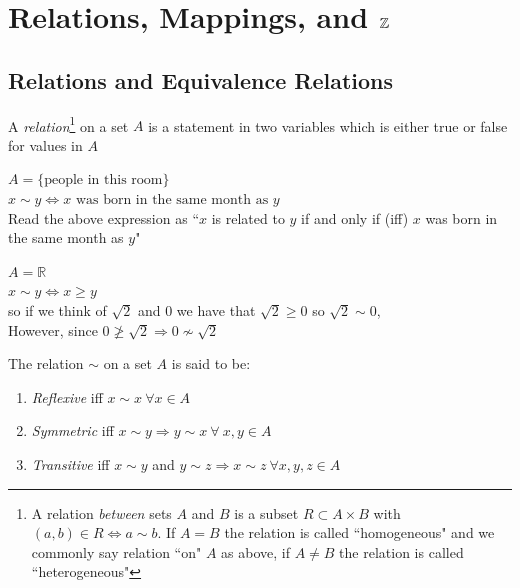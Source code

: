 


\chapter{\texorpdfstring{Relations, Mappings, and ${\mathbb{ Z}}$}{Relations, Mappings, and Z (integers)}}
\vspace{-0.1in}
\section{Relations and Equivalence Relations}
\begin{definition}[Relations]
A \textit{relation}\footnote{
    A relation \textit{between} sets $A$ and $B$ is a subset $R\subset A\times B$ with $(a,b)\in R \iff a\sim b $. If $A=B$ the relation is called ``homogeneous" and we commonly say relation ``on" $A$ as above, if $A\neq B$ the relation is called ``heterogeneous"
} on a set $A$ is a statement in two variables which is either true or false for values in $A$
\end{definition}
\begin{example}
\label{ex:firstExample}
$A=\{\text{people in this room}\}$\\
$x\sim y \Leftrightarrow x \text{ was born in the same month as } y$\\
Read the above expression as ``$x$ is related to $y$ if and only if (iff) $x$ was born in the same month as $y$"
\end{example}
\begin{example}
    \label{ex:secondExample}
$A=\mathbb{R}$\\
$x\sim y \Leftrightarrow x \geq y$\\
so if we think of $\sqrt{2}$ and $0$ we have that $\sqrt{2}\geq 0$ so $\sqrt{2}\sim 0$, \\
However, since $0 \not\geq \sqrt{2} \Rightarrow 0\not\sim \sqrt{2}$
\end{example}
\begin{definition}
The relation $\sim$ on a set $A$ is said to be:
\begin{enumerate}[label=\roman*)]
    \item \textit{Reflexive} iff $x\sim x \ \forall x \in A$
    \item \textit{Symmetric} iff $x\sim y \Rightarrow y\sim x \ \forall \ x,y \in A$
    \item \textit{Transitive} iff $x\sim y$ and $y\sim z \Rightarrow x\sim z \ \forall x,y,z \in A$
\end{enumerate}
\end{definition}
